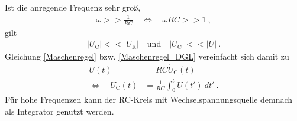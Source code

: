 \ \\
Ist die anregende Frequenz sehr groß, 
\begin{align}
	\omega >> \frac{1}{RC} \quad\Leftrightarrow\quad \omega RC >> 1 \ ,
\end{align}
gilt
\begin{align}
	|U_\text{C}| << |U_\text{R}| \quad \text{und} \quad |U_\text{C}| << |U| \ .
\end{align}
Gleichung \eqref{Maschenregel} bzw. \eqref{Maschenregel_DGL} vereinfacht sich damit zu
\begin{align}
	U(t) &= RC\dot{U}_\text{C}(t) \\
	\Leftrightarrow\quad U_\text{C}(t) &= \frac{1}{RC}\int_0^t U(t')\ dt' \ .
\end{align}
Für hohe Frequenzen kann der RC-Kreis mit Wechselspannungsquelle demnach als Integrator genutzt werden.